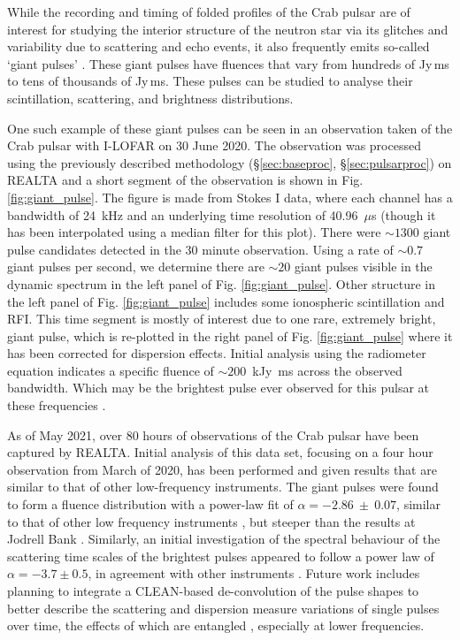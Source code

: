 While the recording and timing of folded profiles of the Crab pulsar are of interest for studying the interior structure of the neutron star via its glitches \citep{Lyne2015} and variability due to scattering and echo events, it also frequently emits so-called `giant pulses' \citep{Meyers2017}. These giant pulses have fluences that vary from hundreds of Jy\,ms to tens of thousands of Jy\,ms. These pulses can be studied to analyse their scintillation, scattering, and brightness distributions.

One such example of these giant pulses can be seen in an observation taken of the Crab pulsar with I-LOFAR on 30 June 2020. The observation was processed using the previously described methodology (\S \ref{sec:baseproc}, \S \ref{sec:pulsarproc}) on REALTA and a short segment of the observation is shown in Fig. \ref{fig:giant_pulse}. The figure is made from Stokes I data, where each channel has a bandwidth of 24~kHz and an underlying time resolution of 40.96~$\mu$s (though it has been interpolated using a median filter for this plot). There were $\sim 1300$ giant pulse candidates detected in the 30 minute observation. Using a rate of $\sim 0.7$ giant pulses per second, we determine there are $\sim 20$ giant pulses visible in the dynamic spectrum in the left panel of Fig. \ref{fig:giant_pulse}. Other structure in the left panel of Fig. \ref{fig:giant_pulse} includes some ionospheric scintillation and RFI. This time segment is mostly of interest due to one rare, extremely bright, giant pulse, which is re-plotted in the right panel of Fig. \ref{fig:giant_pulse} where it has been corrected for dispersion effects. Initial analysis using the radiometer equation indicates a specific fluence of $\sim 200$~kJy~ms across the observed bandwidth. Which may be the brightest pulse ever observed for this pulsar at these frequencies \citep{Karuppusamy2012,Meyers2017,VanLeeuwen2020}.

As of May 2021, over 80 hours of observations of the Crab pulsar have been captured by REALTA. Initial analysis of this data set, focusing on a four hour observation from March of 2020, has been performed and given results that are similar to that of other low-frequency instruments. The giant pulses were found to form a fluence distribution with a power-law fit of $\alpha = -2.86~\pm~0.07$, similar to that of other low frequency instruments \citep{Meyers2017}, but steeper than the results at Jodrell Bank \citep{Mickaliger2017}. Similarly, an initial investigation of the spectral behaviour of the scattering time scales of the brightest pulses appeared to follow a power law of $\alpha = -3.7 \pm 0.5$, in agreement with other instruments \citep{Driessen2019}. Future work includes planning to integrate a CLEAN-based de-convolution \citep[see][]{Bhat2003} of the pulse shapes to better describe the scattering and dispersion measure variations of single pulses over time, the effects of which are entangled \citep{McKee2018}, especially at lower frequencies.

